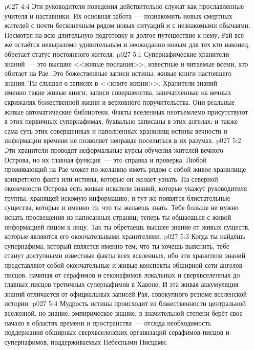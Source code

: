 \vs p027 4:4 Эти руководители поведения действительно служат как прославленные учителя и наставники. Их основная забота~--- познакомить новых смертных жителей с почти бесконечным рядом новых ситуаций и с незнакомыми обычаями. Несмотря на всю длительную подготовку и долгое путешествие к нему, Рай всё же остаётся невыразимо удивительным и неожиданно новым для тех кто наконец, обретает статус постоянного жителя.
\vs p027 5:1 Супернафические хранители знаний~--- это высшие <<живые послания>>, известные и читаемые всеми, кто обитает на Рае. Это божественные записи истины, живые книги настоящего знания. Ты слышал о записях в <<книге жизни>>. Хранители знаний~--- именно такие живые книги, записи совершенства, запечатлённые на вечных скрижалях божественной жизни и верховного поручительства. Они реальные живые автоматические библиотеки. Факты вселенных неотъемлемо присутствуют в этих первичных супернафимах, буквально записаны в этих ангелах; и также сама суть этих совершенных и наполненных хранилищ истины вечности и информации времени не позволяет неправде поселиться в их разумах.
\vs p027 5:2 Эти хранители проводят неформальные курсы обучения жителей вечного Острова, но их главная функция~--- это справка и проверка. Любой проживающий на Рае может по желанию иметь рядом с собой живое хранилище конкретного факта или истины, которые он желает узнать. На северной оконечности Острова есть живые искатели знаний, которые укажут руководителя группы, хранящей искомую информацию; и тут же появятся блистательные существа, которые и  именно то, что ты желаешь знать. Тебе больше не нужно искать просвещения из написанных страниц; теперь ты общаешься с живой информацией лицом к лицу. Так ты обретаешь высшее знание от живых существ, которые являются его окончательными хранителями.
\vs p027 5:3 Когда ты найдёшь супернафима, который является именно тем, что ты хочешь выяснить, тебе станут доступными  известные факты всех вселенных, ибо эти хранители знаний представляют собой окончательные и живые конспекты обширной сети ангелов\hyp{}писцов, начиная от серафимов и секонафимов локальных и сверхвселенных до главных писцов третичных супернафимов в Хавоне. И эта живая аккумуляция знаний отличается от официальных записей Рая, совокупного резюме вселенской истории.
\vs p027 5:4 Мудрость истины происходит из божественности центральной вселенной, но знание, эмпирическое знание, в значительной степени берёт свое начало в областях времени и пространства~--- отсюда необходимость поддержания обширных сверхвселенских организаций серафимов\hyp{}писцов и супернафимов, поддерживаемых Небесными Писцами.
